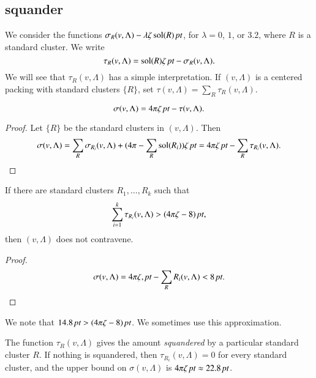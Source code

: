 \subsection{squander}%



We consider the functions
    $\sigma_R(v,\Lambda)-\lambda\zeta\operatorname{sol}(R)\,\hbox{\it pt}$,
for $\lambda=0$, $1$, or $3.2$, where $R$ is a standard cluster.
We write
    $$
    \tau_R(v,\Lambda) = \operatorname{sol}(R)\zeta\,\hbox{\it pt} -
    \sigma_R(v,\Lambda).
    $$
We will see that $\tau_R(v,\Lambda)$ has a simple interpretation.  If $(v,\Lambda)$
is a centered packing with standard clusters $\{R\}$, set $\tau(v,\Lambda)
= \sum_{R}\tau_R(v,\Lambda)$.
\smallskip



\begin{lemma}\label{lemma:sigma-tau}
    $$\sigma(v,\Lambda) = {4\pi \zeta\,\hbox{\it pt}} - \tau(v,\Lambda).$$
\end{lemma}

\begin{proof} Let $\{R\}$ be the standard clusters in $(v,\Lambda)$. Then
    $$
    \sigma(v,\Lambda) = \sum_R\sigma_{R_i}(v,\Lambda) +
        (4\pi-\sum_R\operatorname{sol}(R_i))\zeta\,\hbox{\it pt} = 4\pi \zeta\,\hbox{\it pt} - \sum_R\tau_{R_i}(v,\Lambda).
    $$
\end{proof}


\begin{lemma}
If there are standard clusters $R_1,\ldots,R_k$ such that
$$\sum_{i=1}^k \tau_{R_i}(v,\Lambda)> (4\pi\zeta-8)\,\hbox{\it pt},$$
then $(v,\Lambda)$ does not contravene.
\end{lemma}

\begin{proof}
$$\sigma(v,\Lambda) = 4\pi\zeta,\hbox{\it pt} -\sum_R{R_i}(v,\Lambda) < 8\,\hbox{\it pt}.$$
\end{proof}

We note that $14.8\,\hbox{\it pt} > (4\pi\zeta-8)\,\hbox{\it pt}$.  We sometimes use this
approximation.


The function $\tau_R(v,\Lambda)$ gives the amount {\it squandered\/} by a
particular standard cluster $R$.  If nothing is squandered, then
$\tau_{R_i}(v,\Lambda)=0$ for every standard cluster, and the upper bound
on $\sigma(v,\Lambda)$ is
    $4\pi\zeta\,\hbox{\it pt}\approx 22.8\,\hbox{\it pt}$.



